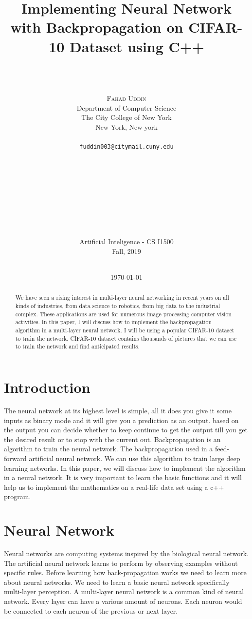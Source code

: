 \documentclass[12pt]{article}
\title{Implementing Neural Network with Backpropagation on CIFAR-10 Dataset using C++}
\author{
	\mbox{}\\ %
	\\
	\\
	\textsc{Fahad Uddin}
	\qquad
	\mbox{}\\ %
	Department of Computer Science\\
	The City College of New York\\
	New York, New york\\
	\\
	\texttt{fuddin003@citymail.cuny.edu}
	\\
	\\
	\\
	\\
	\\
	\\
	\\
	\\
	\\
	\mbox{}\\ %
	Artificial Inteligence - CS I1500\\
	Fall, 2019\\
	\\
	\normalsize
	\normalsize
}
\date{\today}
\begin{document}
\maketitle
{}                   %
\setcounter{page}{0}                    %

\pagebreak

\begin{abstract}{
We have seen a rising interest in multi-layer neural networking in recent years on all kinds of industries, from data science to robotics, from big data to the industrial complex. These applications are used for numerous image processing computer vision activities. In this paper, I will discuss how to implement the backpropagation algorithm in a multi-layer neural network. I will be using a popular CIFAR-10 dataset to train the network. CIFAR-10 dataset contains thousands of pictures that we can use to train the network and find anticipated results.
}
\end{abstract}
\pagebreak

\tableofcontents

\pagebreak


\section{Introduction}

The neural network at its highest level is simple, all it does you give it some inputs as binary mode and it will give you a prediction as an output. based on the output you can decide whether to keep continue to get the output till you get the desired result or to stop with the current out. Backpropagation is an algorithm to train the neural network. The backpropagation used in a feed-forward artificial neural network. We can use this algorithm to train large deep learning networks. In this paper, we will discuss how to implement the algorithm in a neural network. It is very important to learn the basic functions and it will help us to implement the mathematics on a real-life data set using a c++ program.\cite{BOOK:1}

\section{Neural Network}

Neural networks are computing systems inspired by the biological neural network. The artificial neural network learns to perform by observing examples without specific rules. Before learning how back-propagation works we need to learn more about neural networks. We need to learn a basic neural network specifically multi-layer perception. A multi-layer neural network is a common kind of neural network. Every layer can have a various amount of neurons. Each neuron would be connected to each neuron of the previous or next layer.
\end{document}
